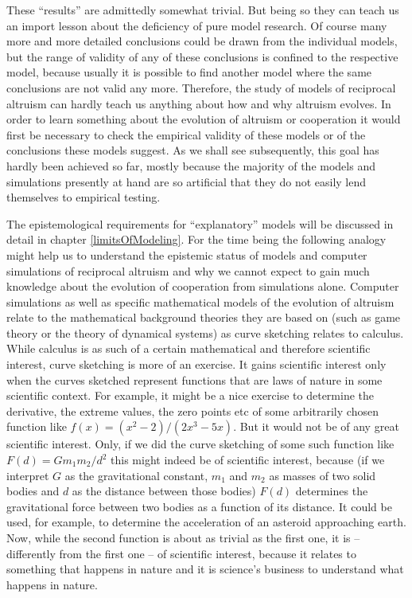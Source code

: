 These ``results'' are admittedly somewhat trivial. But being so they can teach us
an import lesson about the deficiency of pure model research. Of course many more and
more detailed conclusions could be drawn from the individual models, but the
range of validity of any of these conclusions is confined to the respective
model, because usually it is possible to find another model where the same
conclusions are not valid any more. Therefore, the study of models of
reciprocal altruism can hardly teach us anything about how and why altruism
evolves. In order to learn something about the evolution of altruism or
cooperation it would first be necessary to check the empirical validity of
these models or of the conclusions these models suggest. As we shall see
subsequently, this goal has hardly been achieved so far, mostly because the
majority of the models and simulations presently at hand are so artificial
that they do not easily lend themselves to empirical testing.

The epistemological requirements for ``explanatory'' models will be discussed
in detail in chapter \ref{limitsOfModeling}. For the time being the following
analogy might help us to understand the epistemic status of models and computer
simulations of reciprocal altruism and why we cannot expect to gain
much knowledge about the evolution of cooperation from simulations alone.
Computer simulations as well as specific mathematical models of the evolution
of altruism relate to the mathematical background theories they are based on
(such as game theory or the theory of dynamical systems) as curve sketching
relates to calculus. While calculus is as such of a certain mathematical and
therefore scientific interest, curve sketching is more of an exercise. It
gains scientific interest only when the curves sketched represent functions
that are laws of nature in some scientific context. For example, it might be a
nice exercise to determine the derivative, the extreme values, the zero points
etc of some arbitrarily chosen function like $f(x) = (x^2 - 2) / (2x^3 -
5x)$. But it would not be of any great scientific interest. Only, if we did
the curve sketching of some such function like $F(d) = Gm_1m_2 / d^2$ this 
might indeed be of scientific interest, because (if we interpret $G$ as 
the gravitational constant, $m_1$ and $m_2$ as masses
of two solid bodies and $d$ as the distance between those bodies) 
$F(d)$ determines the gravitational force
between two bodies as a function of its distance. It could be used, for
example, to determine the acceleration of an asteroid approaching earth. Now,
while the second function is about as trivial as the first one, it is -- differently
from the first one -- of scientific interest, because it relates to something
that happens in nature and it is science's business to understand what happens
in nature.

